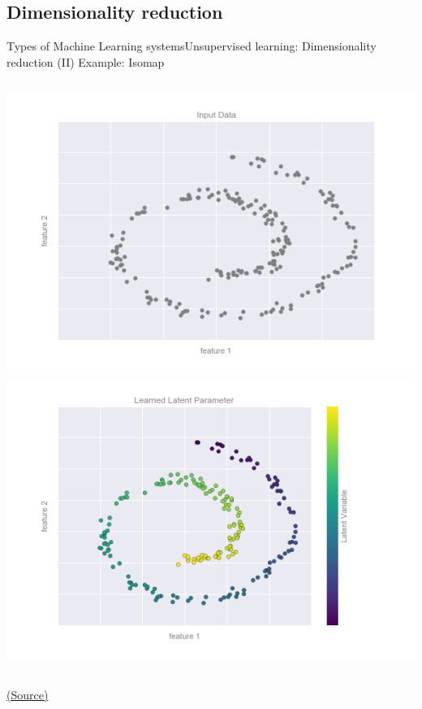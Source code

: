 \documentclass[10pt,compress]{beamer} %
\begin{document}
\subsection{Dimensionality reduction}
\begin{frame}[fragile]{Types of Machine Learning systems}{Unsupervised learning: Dimensionality reduction (II)}
	Example: Isomap

    \begin{columns}
			\includegraphics[width=\linewidth]{figs/05.01-dimesionality-1.png}
			\includegraphics[width=\linewidth]{figs/05.01-dimesionality-2.png}
    \end{columns}
    \centering \tiny{\href{https://jakevdp.github.io/PythonDataScienceHandbook/05.01-what-is-machine-learning.html}{(Source)}}

\end{frame}
\end{document}

